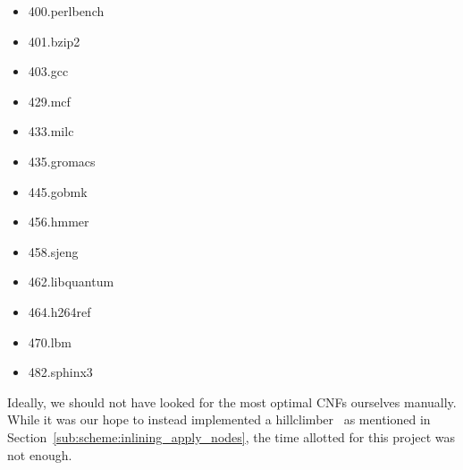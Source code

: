 \begin{multicols}{2}
	\begin{itemize}
		\item 400.perlbench
		\item 401.bzip2
		\item 403.gcc
		\item 429.mcf
		\item 433.milc
		\item 435.gromacs
		\item 445.gobmk
		\item 456.hmmer
		\item 458.sjeng
		\item 462.libquantum
		\item 464.h264ref
		\item 470.lbm
		\item 482.sphinx3
	\end{itemize}
\end{multicols}

Ideally, we should not have looked for the most optimal CNFs ourselves manually.
While it was our hope to instead implemented a
hillclimber~\cite{AdaptvStratInlSubst} as mentioned in
Section~\ref{sub:scheme:inlining_apply_nodes}, the time allotted for this
project was not enough.
